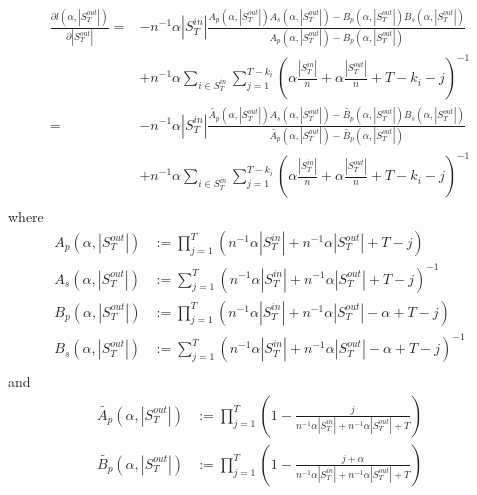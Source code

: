 \documentclass[a4paper, 12pt]{article}
\newcommand{\sout}{|S^{out}_T|}
\newcommand{\sint}{|S^{in}_T|}
\begin{document}
\begin{align} \label{eq:9}
   \frac{\partial l(\alpha, \sout)}{\partial \sout} =& -n^{-1} \alpha \sint \frac{A_p(\alpha, \sout) A_s(\alpha, \sout) - B_p(\alpha, \sout) B_s(\alpha, \sout)}{A_p(\alpha, \sout) - B_p(\alpha, \sout)}\nonumber \\
    &+ n^{-1}\alpha \sum_{i \in S_T^{in}} \sum_{j = 1}^{T - k_i} (\alpha \frac{\sint}{n} + \alpha \frac{\sout}{n} + T - k_i - j)^{-1} \nonumber \\
    =& -n^{-1} \alpha \sint \frac{\widetilde{A_p}(\alpha, \sout) A_s(\alpha, \sout) - \widetilde{B_p}(\alpha, \sout) B_s(\alpha, \sout)}{\widetilde{A_p}(\alpha, \sout) - \widetilde{B_p}(\alpha, \sout)}\nonumber \\
    &+ n^{-1}\alpha \sum_{i \in S_T^{in}} \sum_{j = 1}^{T - k_i} (\alpha \frac{\sint}{n} + \alpha \frac{\sout}{n} + T - k_i - j)^{-1} \nonumber \\
\end{align}
where
\begin{align*}
A_p(\alpha, \sout) &:= \prod_{j=1}^T(n^{-1}\alpha \sint + n^{-1} \alpha \sout + T - j) \\
A_s(\alpha, \sout) &:= \sum_{j = 1}^{T} (n^{-1}\alpha \sint + n^{-1} \alpha \sout + T - j)^{-1} \\
B_p(\alpha, \sout) &:= \prod_{j=1}^T (n^{-1} \alpha \sint + n^{-1} \alpha \sout - \alpha + T - j) \\
B_s(\alpha, \sout) &:= \sum_{j = 1}^{T} (n^{-1} \alpha \sint + n^{-1} \alpha \sout - \alpha + T - j)^{-1} \\
\end{align*}
and
\begin{align*}
\widetilde{A_p}(\alpha, \sout) &:= \prod_{j=1}^T \left(1 - \frac{j}{n^{-1}\alpha \sint + n^{-1} \alpha \sout + T}\right) \\
\widetilde{B_p}(\alpha, \sout) &:= \prod_{j=1}^T \left(1 - \frac{j + \alpha}{n^{-1} \alpha \sint + n^{-1} \alpha \sout + T}\right)\\
\end{align*}
\end{document}
